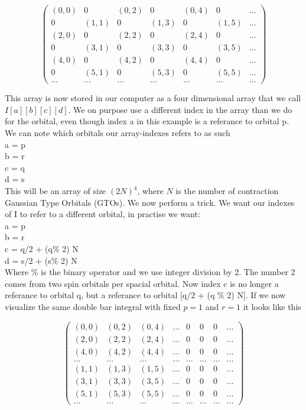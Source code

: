 \documentclass[a4paper,norsk,11pt,twoside]{report}
\begin{document}
\[ \left( \begin{array}{ccccccc}
(0,0) & 0 & (0,2) & 0 & (0,4) & 0 & \dots \\
0 & (1,1) & 0 & (1,3) & 0 & (1,5) & \dots \\
(2,0) & 0 & (2,2) & 0 & (2,4) & 0 & \dots \\
0 & (3,1) & 0 & (3,3) & 0 & (3,5) & \dots \\
(4,0) & 0 & (4,2) & 0 & (4,4) & 0 & \dots \\
0 & (5,1) & 0 & (5,3) & 0 & (5,5) & \dots \\
\dots & \dots & \dots & \dots & \dots & \dots & \dots \end{array} \right)\]

This array is now stored in our computer as a four dimensional array that we call $I[a][b][c][d]$. We on purpose use a different index in the array than we do for the orbital, even though index a in this example is a referance to orbital p. We can note which orbitals our array-indexes refers to as such\\
a = p \\
b = r \\
c = q \\
d = s \\

This will be an array of size $(2N)^4$, where $N$ is the number of contraction Gaussian Type Orbitals (GTOs). We now perform a trick. We want our indexes of I to refer to a different orbital, in practise we want:\\
a = p\\
b = r\\
c = q/2 + (q\% 2) N\\
d = s/2 + (s\% 2) N\\

Where \% is the binary operator and we use integer division by 2. The number 2 comes from two spin orbitals per spacial orbital. Now index c is no longer a referance to orbital q, but a referance to orbital [q/2 + (q \% 2) N]. If we now visualize the same double bar integral with fixed $p=1$ and $r=1$ it looks like this

\[ \left( \begin{array}{cccccccc}
(0,0) & (0,2) & (0,4) & \dots & 0 & 0 & 0 & \dots \\
(2,0) & (2,2) & (2,4) & \dots & 0 & 0 & 0 & \dots\\
(4,0) & (4,2) & (4,4) & \dots & 0 & 0 & 0 & \dots\\
\dots & \dots & \dots & \dots & \dots & \dots & \dots & \dots\\
(1,1) & (1,3) & (1,5) & \dots & 0 & 0 & 0 & \dots\\
(3,1) & (3,3) & (3,5) & \dots & 0 & 0 & 0 & \dots\\
(5,1) & (5,3) & (5,5) & \dots & 0 & 0 & 0 & \dots\\
\dots & \dots & \dots & \dots & \dots & \dots & \dots & \dots \end{array} \right)\]
\end{document}
